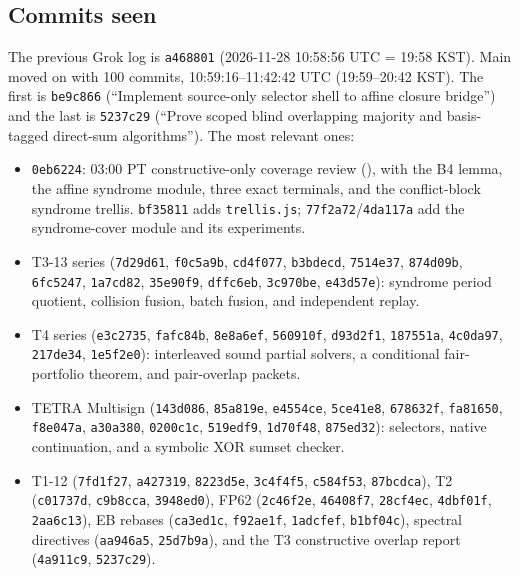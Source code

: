 \documentclass[11pt]{article}
\theoremstyle{definition}
\begin{document}
\subsection{Commits seen}
The previous Grok log is \texttt{a468801} (2026-11-28 10:58:56 UTC = 19:58 KST).
Main moved on with 100 commits, 10:59:16--11:42:42 UTC (19:59--20:42 KST).
The first is \texttt{be9c866} (``Implement source-only selector shell to affine closure bridge'') and the last is
\texttt{5237c29} (``Prove scoped blind overlapping majority and basis-tagged direct-sum algorithms'').
The most relevant ones:
\begin{itemize}
\item \texttt{0eb6224}: 03:00 PT constructive-only coverage review (), with the B4 lemma, the affine syndrome module, three exact terminals, and the conflict-block syndrome trellis. \texttt{bf35811} adds \texttt{trellis.js}; \texttt{77f2a72}/\texttt{4da117a} add the syndrome-cover module and its experiments.
\item T3-13 series (\texttt{7d29d61}, \texttt{f0c5a9b}, \texttt{cd4f077}, \texttt{b3bdecd}, \texttt{7514e37}, \texttt{874d09b}, \texttt{6fc5247}, \texttt{1a7cd82}, \texttt{35e90f9}, \texttt{dffc6eb}, \texttt{3c970be}, \texttt{e43d57e}): syndrome period quotient, collision fusion, batch fusion, and independent replay.
\item T4 series (\texttt{e3c2735}, \texttt{fafc84b}, \texttt{8e8a6ef}, \texttt{560910f}, \texttt{d93d2f1}, \texttt{187551a}, \texttt{4c0da97}, \texttt{217de34}, \texttt{1e5f2e0}): interleaved sound partial solvers, a conditional fair-portfolio theorem, and pair-overlap packets.
\item TETRA Multisign (\texttt{143d086}, \texttt{85a819e}, \texttt{e4554ce}, \texttt{5ce41e8}, \texttt{678632f}, \texttt{fa81650}, \texttt{f8e047a}, \texttt{a30a380}, \texttt{0200c1c}, \texttt{519edf9}, \texttt{1d70f48}, \texttt{875ed32}): selectors, native continuation, and a symbolic XOR sumset checker.
\item T1-12 (\texttt{7fd1f27}, \texttt{a427319}, \texttt{8223d5e}, \texttt{3c4f4f5}, \texttt{c584f53}, \texttt{87bcdca}), T2 (\texttt{c01737d}, \texttt{c9b8cca}, \texttt{3948ed0}), FP62 (\texttt{2c46f2e}, \texttt{46408f7}, \texttt{28cf4ec}, \texttt{4dbf01f}, \texttt{2aa6c13}), EB rebases (\texttt{ca3ed1c}, \texttt{f92ae1f}, \texttt{1adcfef}, \texttt{b1bf04c}), spectral directives (\texttt{aa946a5}, \texttt{25d7b9a}), and the T3 constructive overlap report (\texttt{4a911c9}, \texttt{5237c29}).
\end{itemize}
\end{document}
